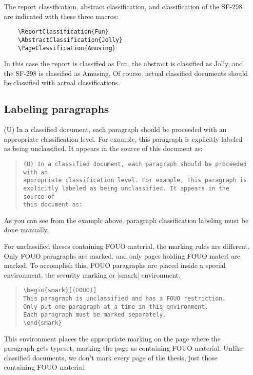The report classification, abstract classification, and classification
of the SF-298 are indicated with these three macros:
\begin{Verbatim}
    \ReportClassification{Fun}
    \AbstractClassification{Jolly}
    \PageClassification{Amusing}
\end{Verbatim}

In this case the report is classified as Fun, the abstract is classified
as Jolly, and the SF-298 is classified as Amusing. Of course, actual 
classified documents should be classified with actual classifications.


\subsection{Labeling paragraphs}
(U) In a classified document, each paragraph should be proceeded with an
appropriate classification level. For example, this paragraph is
explicitly labeled as being unclassified. It appears in the source of
this document as:

\begin{quotation}
\begin{Verbatim}[fontsize=\small]
(U) In a classified document, each paragraph should be proceeded with an
appropriate classification level. For example, this paragraph is
explicitly labeled as being unclassified. It appears in the source of
this document as:
\end{Verbatim}
\end{quotation}

As you can see from the example above, paragraph classification
labeling must be done manually.

For unclassified theses containing FOUO material, the marking rules are different.
Only FOUO paragraphs are marked, and only pages holding FOUO materl are marked.
To accomplish this, FOUO paragraphs are placed inside a special
environment, the security marking or |smark| environment.
\begin{quotation}
\begin{Verbatim}[fontsize=\small]
\begin{smark}[(FOUO)]
This paragraph is unclassified and has a FOUO restriction.
Only put one paragraph at a time in this environment.
Each paragraph must be marked separately.
\end{smark}
\end{Verbatim}
\end{quotation}

This environment places the appropriate marking on the page where
the paragraph gets typeset, marking the page as containing FOUO material. 
Unlike classified documents, we don't mark every page of the thesis, just
those containing FOUO material. 

